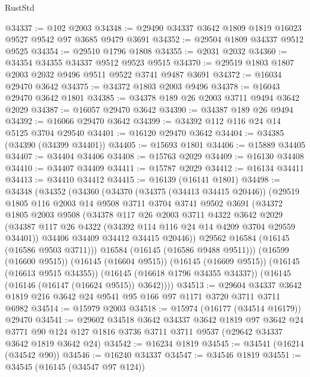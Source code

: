 \begin{lexlean}{RustStd}
\begin{coremodule}
@34337 := @102 @2003
@34348 := @29490 @34337 @3642 @1809 @1819 @16023 @9527 @9542 @97 @3685 @9479 @3691
@34352 := @29504 @1809 @34337 @9512 @9525
@34354 := @29510 @1796 @1808
@34355 := @2031 @2032
@34360 := @34354 @34355 @34337 @9512 @9523 @9515
@34370 := @29519 @1803 @1807 @2003 @2032 @9496 @9511 @9522 @3741 @9487 @3691
@34372 := @16034 @29470 @3642
@34375 := @34372 @1803 @2003 @9496
@34378 := @16043 @29470 @3642 @1801
@34385 := @34378 @189 @26 @2003 @3711 @9494 @3642 @2029
@34387 := @16057 @29470 @3642
@34390 := @34387 @189 @26 @9494
@34392 := @16066 @29470 @3642
@34399 := @34392 @112 @116 @24 @14 @5125 @3704 @29540
@34401 := @16120 @29470 @3642
@34404 := @34385 (@34390 (@34399 @34401))
@34405 := @15693 @1801
@34406 := @15889 @34405
@34407 := @34404 @34406
@34408 := @15763 @2029
@34409 := @16130 @34408
@34410 := @34407 @34409
@34411 := @15787 @2029
@34412 := @16134 @34411
@34413 := @34410 @34412
@34415 := @16139 (@16141 @1801)
@34498 := @34348
    (@34352
      (@34360
        (@34370
          (@34375 (@34413 @34415 @20446))
          (@29519
            @1805
            @116
            @2003
            @14
            @9508
            @3711
            @3704
            @3741
            @9502
            @3691
            (@34372
              @1805
              @2003
              @9508
              (@34378
                @117
                @26
                @2003
                @3711
                @4322
                @3642
                @2029
                (@34387 @117 @26 @4322 (@34392 @114 @116 @24 @14 @4209 @3704 @29559 @34401))
                @34406
                @34409
                @34412
                @34415
                @20446))
            @29562
            @16584
            (@16145 (@16586 @9503 @3711)))
          @16584
          (@16145 (@16586 @9488 @9511)))
        (@16599 (@16600 @9515))
        (@16145 (@16604 @9515))
        (@16145 (@16609 @9515))
        (@16145 (@16613 @9515 @34355))
        (@16145 (@16618 @1796 @34355 @34337))
        (@16145 (@16146 (@16147 (@16624 @9515)) @3642))))
@34513 := @29604 @34337 @3642 @1819 @216 @3642 @24 @9541 @95 @166 @97 @1171 @3720 @3711 @3711 @6982
@34514 := @15979 @2003
@34518 := @15974 (@16177 (@34514 @16179)) @29470
@34541 := @29602
    @34518
    @3642
    @34337
    @3642
    @1819
    @97
    @3642
    @24
    @3771
    @90
    @124
    @127
    @1816
    @3736
    @3711
    @3711
    @9537
    (@29642 @34337 @3642 @1819 @3642 @24)
@34542 := @16234 @1819
@34545 := @34541 (@16214 (@34542 @90))
@34546 := @16240 @34337
@34547 := @34546 @1819
@34551 := @34545 (@16145 (@34547 @97 @124))

\end{coremodule}
\end{lexlean}
